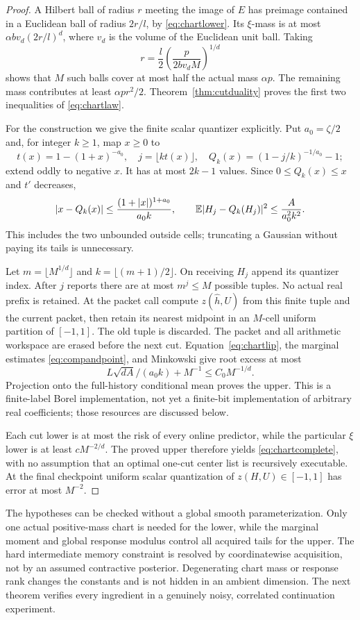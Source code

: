 \begin{proof}
A Hilbert ball of radius $r$ meeting the image of $E$ has preimage contained in a Euclidean ball of radius $2r/l$, by \eqref{eq:chartlower}. Its $\xi$-mass is at most $\alpha b v_d(2r/l)^d$, where $v_d$ is the volume of the Euclidean unit ball. Taking
\[
 r=\frac l2\left(\frac{p}{2b v_d M}\right)^{1/d}
\]
shows that $M$ such balls cover at most half the actual mass $\alpha p$. The remaining mass contributes at least $\alpha p r^2/2$. Theorem~\ref{thm:cutduality} proves the first two inequalities of \eqref{eq:chartlaw}.

For the construction we give the finite scalar quantizer explicitly. Put $a_0=\zeta/2$ and, for integer $k\ge1$, map $x\ge0$ to
\[
 t(x)=1-(1+x)^{-a_0},\quad j=\lfloor kt(x)\rfloor,\quad
 Q_k(x)=(1-j/k)^{-1/a_0}-1;
\]
extend oddly to negative $x$. It has at most $2k-1$ values. Since $0\le Q_k(x)\le x$ and $t'$ decreases,
\begin{equation}\label{eq:compandpoint}
 |x-Q_k(x)|\le\frac{(1+|x|)^{1+a_0}}{a_0k},\qquad
 \mathbb E|H_j-Q_k(H_j)|^2\le\frac{A}{a_0^2k^2}.
\end{equation}
This includes the two unbounded outside cells; truncating a Gaussian without paying its tails is unnecessary.

Let $m=\lfloor M^{1/d}\rfloor$ and $k=\lfloor(m+1)/2\rfloor$. On receiving $H_j$ append its quantizer index. After $j$ reports there are at most $m^j\le M$ possible tuples. No actual real prefix is retained. At the packet call compute $z(\widehat h,U)$ from this finite tuple and the current packet, then retain its nearest midpoint in an $M$-cell uniform partition of $[-1,1]$. The old tuple is discarded. The packet and all arithmetic workspace are erased before the next cut. Equation~\eqref{eq:chartlip}, the marginal estimates \eqref{eq:compandpoint}, and Minkowski give root excess at most
\[
 L\sqrt{dA}/(a_0k)+M^{-1}\le C_0M^{-1/d}.
\]
Projection onto the full-history conditional mean proves the upper. This is a finite-label Borel implementation, not yet a finite-bit implementation of arbitrary real coefficients; those resources are discussed below.

Each cut lower is at most the risk of every online predictor, while the particular $\xi$ lower is at least $cM^{-2/d}$. The proved upper therefore yields \eqref{eq:chartcomplete}, with no assumption that an optimal one-cut center list is recursively executable. At the final checkpoint uniform scalar quantization of $z(H,U)\in[-1,1]$ has error at most $M^{-2}$.
\end{proof}

The hypotheses can be checked without a global smooth parameterization. Only one actual positive-mass chart is needed for the lower, while the marginal moment and global response modulus control all acquired tails for the upper. The hard intermediate memory constraint is resolved by coordinatewise acquisition, not by an assumed contractive posterior. Degenerating chart mass or response rank changes the constants and is not hidden in an ambient dimension. The next theorem verifies every ingredient in a genuinely noisy, correlated continuation experiment.
